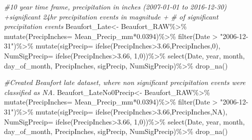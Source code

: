 \documentclass[
  12pt,
]{article}
\newenvironment{Shaded}{\begin{snugshade}}{\end{snugshade}}
\newcommand{\AttributeTok}[1]{\textcolor[rgb]{0.77,0.63,0.00}{#1}}
\newcommand{\CommentTok}[1]{\textcolor[rgb]{0.56,0.35,0.01}{\textit{#1}}}
\newcommand{\ConstantTok}[1]{\textcolor[rgb]{0.00,0.00,0.00}{#1}}
\newcommand{\DecValTok}[1]{\textcolor[rgb]{0.00,0.00,0.81}{#1}}
\newcommand{\FloatTok}[1]{\textcolor[rgb]{0.00,0.00,0.81}{#1}}
\newcommand{\FunctionTok}[1]{\textcolor[rgb]{0.00,0.00,0.00}{#1}}
\newcommand{\NormalTok}[1]{#1}
\newcommand{\OtherTok}[1]{\textcolor[rgb]{0.56,0.35,0.01}{#1}}
\newcommand{\SpecialCharTok}[1]{\textcolor[rgb]{0.00,0.00,0.00}{#1}}
\newcommand{\StringTok}[1]{\textcolor[rgb]{0.31,0.60,0.02}{#1}}
\begin{document}
\begin{Shaded}
\begin{Highlighting}[]
\CommentTok{\#10 year time frame, precipitation in inches (2007{-}01{-}01 to 2016{-}12{-}30) +significant 24hr precipitation events in magnitude + \# of significant precipitation events}
\NormalTok{Beaufort\_Late}\OtherTok{\textless{}{-}}\NormalTok{ Beaufort\_RAW}\SpecialCharTok{\%\textgreater{}\%}
  \FunctionTok{mutate}\NormalTok{(}\AttributeTok{PrecipInches=}\NormalTok{ Mean\_Precip\_mm}\SpecialCharTok{*}\FloatTok{0.0394}\NormalTok{)}\SpecialCharTok{\%\textgreater{}\%}
  \FunctionTok{filter}\NormalTok{(Date }\SpecialCharTok{\textgreater{}} \StringTok{"2006{-}12{-}31"}\NormalTok{)}\SpecialCharTok{\%\textgreater{}\%}
  \FunctionTok{mutate}\NormalTok{(}\AttributeTok{sigPrecip=} \FunctionTok{ifelse}\NormalTok{(PrecipInches}\SpecialCharTok{\textgreater{}}\FloatTok{3.66}\NormalTok{,PrecipInches,}\DecValTok{0}\NormalTok{),}
         \AttributeTok{NumSigPrecip=} \FunctionTok{ifelse}\NormalTok{(PrecipInches}\SpecialCharTok{\textgreater{}}\FloatTok{3.66}\NormalTok{, }\DecValTok{1}\NormalTok{,}\DecValTok{0}\NormalTok{))}\SpecialCharTok{\%\textgreater{}\%}
  \FunctionTok{select}\NormalTok{(Date, year, month, }
\NormalTok{         day\_of\_month, PrecipInches, sigPrecip, NumSigPrecip)}\SpecialCharTok{\%\textgreater{}\%}
  \FunctionTok{drop\_na}\NormalTok{()}

\CommentTok{\#Created Beaufort late dataset, where non significant precipitation events were classified as NA.}
\NormalTok{Beaufort\_LateNo0Precip}\OtherTok{\textless{}{-}}\NormalTok{ Beaufort\_RAW}\SpecialCharTok{\%\textgreater{}\%}
  \FunctionTok{mutate}\NormalTok{(}\AttributeTok{PrecipInches=}\NormalTok{ Mean\_Precip\_mm}\SpecialCharTok{*}\FloatTok{0.0394}\NormalTok{)}\SpecialCharTok{\%\textgreater{}\%}
  \FunctionTok{filter}\NormalTok{(Date }\SpecialCharTok{\textgreater{}} \StringTok{"2006{-}12{-}31"}\NormalTok{)}\SpecialCharTok{\%\textgreater{}\%}
  \FunctionTok{mutate}\NormalTok{(}\AttributeTok{sigPrecip=} \FunctionTok{ifelse}\NormalTok{(PrecipInches}\SpecialCharTok{\textgreater{}}\FloatTok{3.66}\NormalTok{,PrecipInches,}\ConstantTok{NA}\NormalTok{),}
         \AttributeTok{NumSigPrecip=} \FunctionTok{ifelse}\NormalTok{(PrecipInches}\SpecialCharTok{\textgreater{}}\FloatTok{3.66}\NormalTok{, }\DecValTok{1}\NormalTok{,}\DecValTok{0}\NormalTok{))}\SpecialCharTok{\%\textgreater{}\%}
  \FunctionTok{select}\NormalTok{(Date, year, month, }
\NormalTok{         day\_of\_month, PrecipInches, sigPrecip, NumSigPrecip)}\SpecialCharTok{\%\textgreater{}\%}
  \FunctionTok{drop\_na}\NormalTok{()}


\end{Highlighting}
\end{Shaded}
\end{document}
